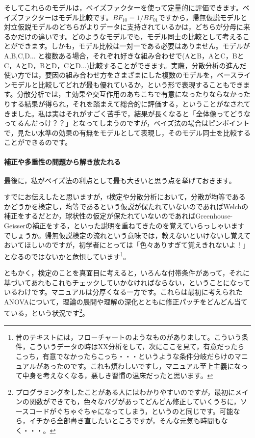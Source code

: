 \documentclass{ltjbook}
\begin{document}
そしてこれらのモデルは，ベイズファクターを使って定量的に評価できます。ベイズファクターはモデル比較です。$BF_{10} = 1/BF_{01}$ですから，帰無仮説モデルと対立仮説モデルのどちらがよりデータに支持されているかは，どちらが分母に来るかだけの違いです。どのようなモデルでも，モデル同士の比較として考えることができます。しかも，モデル比較は一対一である必要はありません。モデルがA,B,C,D... と複数ある場合，それぞれ好きな組み合わせで(AとB，AとC，BとC，AとD，BとD，CとD...)比較することができます。実際，分散分析の進んだ使い方では，要因の組み合わせ方をさまざまにした複数のモデルを，ベースラインモデルと比較してどれが最も優れているか，という形で表現することもできます。分散分析では，主効果や交互作用のあちこちで有意になったりならなかったりする結果が得られ，それを踏まえて総合的に評価する，ということがなされてきました。私は実はそれがすごく苦手で，結果が長くなると「全体像ってどうなってるんだっけ？？」となってしまうのですが，ベイズ法の場合はピンポイントで，見たい水準の効果の有無をモデルとして表現し，そのモデル同士を比較することができるのです。

\paragraph{補正や多重性の問題から解き放たれる}

最後に，私がベイズ法の利点として最も大きいと思う点を挙げておきます。

すでにお伝えしたと思いますが，$t$検定や分散分析において，分散が均等であるかどうかを検定し，均等であるという仮説が保たれていないのであればWelchの補正をするだとか，球状性の仮定が保たれていないのであればGreenhouse-Geisserの補正をする，といった説明を重ねてきたのを覚えていらっしゃいますでしょうか。帰無仮説検定の流れという意味では，教えないといけないし覚えておいてほしいのですが，初学者にとっては「色々ありすぎて覚えきれないよ！」となるのではないかと危惧しています\footnote{昔のテキストには，フローチャートのようなものがありまして。こういう条件，こういうデータの時はXX分析をして，次にここを見て，有意だったらこっち，有意でなかったらこっち・・・というような条件分岐だらけのマニュアルがあったのです。これも煩わしいですし，マニュアル至上主義になって中身を考えなくなる，悪しき習慣の温床だったと思います。}。

ともかく，検定のことを真面目に考えると，いろんな付帯条件があって，それに基づいてあれもこれもチェックしていかなければならない，ということになっているわけです。マニュアルは分厚くなる一方です。これらは最初に考えられたANOVAについて，理論の展開や理解の深化とともに修正パッチをどんどん当てている，という状況です\footnote{プログラミングをしたことがある人にはわかりやすいのですが，最初にメインの関数ができても，色々なバグがあってどんどん修正していくうちに，ソースコードがぐちゃぐちゃになってしまう，というのと同じです。可能なら，イチから全部書き直したいところですが，そんな元気も時間もなく・・・。}。
\end{document}
